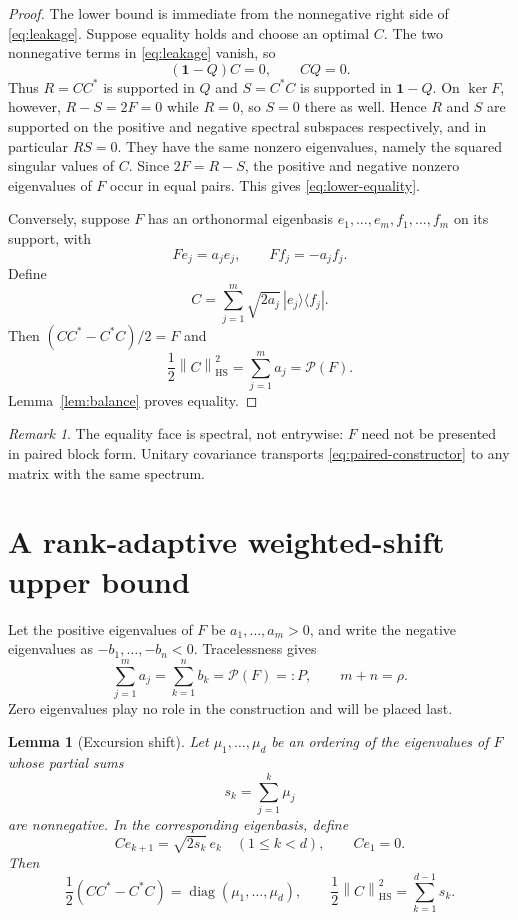 \documentclass[11pt]{article}
\newtheorem{lemma}[theorem]{Lemma}
\theoremstyle{definition}
\theoremstyle{remark}
\newtheorem{remark}[theorem]{Remark}
\newcommand{\diag}{\operatorname{diag}}
\newcommand{\1}{\mathbf 1}
\newcommand{\norm}[1]{\left\lVert #1\right\rVert}
\newcommand{\HS}{\mathrm{HS}}
\newcommand{\PP}{\mathcal P}
\begin{document}
\begin{proof}
The lower bound is immediate from the nonnegative right side of \eqref{eq:leakage}.  Suppose equality holds and choose an optimal $C$.  The two nonnegative terms in \eqref{eq:leakage} vanish, so
\[
 (\1-Q)C=0,\qquad CQ=0.
\]
Thus $R=CC^*$ is supported in $Q$ and $S=C^*C$ is supported in $\1-Q$.  On $\ker F$, however, $R-S=2F=0$ while $R=0$, so $S=0$ there as well.  Hence $R$ and $S$ are supported on the positive and negative spectral subspaces respectively, and in particular $RS=0$.  They have the same nonzero eigenvalues, namely the squared singular values of $C$.  Since $2F=R-S$, the positive and negative nonzero eigenvalues of $F$ occur in equal pairs.  This gives \eqref{eq:lower-equality}.

Conversely, suppose $F$ has an orthonormal eigenbasis $e_1,\ldots,e_m,f_1,\ldots,f_m$ on its support, with
\[
 Fe_j=a_je_j,\qquad Ff_j=-a_jf_j.
\]
Define
\begin{equation}
 C=\sum_{j=1}^m\sqrt{2a_j}\,|e_j\rangle\langle f_j|.
 \label{eq:paired-constructor}
\end{equation}
Then $(CC^*-C^*C)/2=F$ and
\[
 \frac12\norm C_{\HS}^2=\sum_{j=1}^m a_j=\PP(F).
\]
Lemma~\ref{lem:balance} proves equality.
\end{proof}

\begin{remark}
The equality face is spectral, not entrywise: $F$ need not be presented in paired block form.  Unitary covariance transports \eqref{eq:paired-constructor} to any matrix with the same spectrum.
\end{remark}

\section{A rank-adaptive weighted-shift upper bound}
\label{sec:upper}

Let the positive eigenvalues of $F$ be $a_1,\ldots,a_m>0$, and write the negative eigenvalues as $-b_1,\ldots,-b_n<0$.  Tracelessness gives
\begin{equation}
 \sum_{j=1}^m a_j=\sum_{k=1}^n b_k=\PP(F)=:P,
 \qquad m+n=\rho.
 \label{eq:masses}
\end{equation}
Zero eigenvalues play no role in the construction and will be placed last.

\begin{lemma}[Excursion shift]
\label{lem:shift}
Let $\mu_1,\ldots,\mu_d$ be an ordering of the eigenvalues of $F$ whose partial sums
\[
 s_k=\sum_{j=1}^k\mu_j
\]
are nonnegative.  In the corresponding eigenbasis, define
\begin{equation}
 Ce_{k+1}=\sqrt{2s_k}\,e_k\quad(1\le k<d),
 \qquad Ce_1=0.
 \label{eq:shift}
\end{equation}
Then
\[
 \frac12(CC^*-C^*C)=\diag(\mu_1,\ldots,\mu_d),
 \qquad \frac12\norm C_{\HS}^2=\sum_{k=1}^{d-1}s_k.
\]
\end{lemma}
\end{document}
